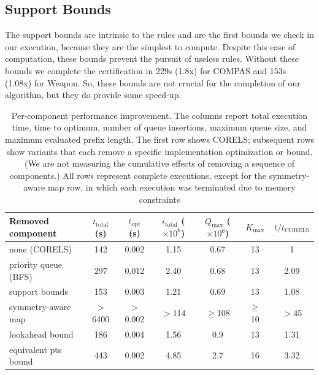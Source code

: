 \subsection{Support Bounds}

The support bounds are intrinsic to the rules and are the first bounds we check in our execution, because they are the simplest to compute.
Despite this ease of computation, these bounds prevent the pursuit of useless rules.
Without these bounds we complete the certification in 229s (1.8x) for COMPAS and 153s (1.08x) for Weapon.
So, these bounds are not crucial for the completion of our algorithm, but they do provide some speed-up.

\begin{table}[t!]
\begin{adjustwidth}{-.4in}{-.4in}
\begin{tabular}{l | c | c | c | c | c | c} 
  Removed component & $t_\text{total}$ (s) & $t_\text{opt}$ (s) & $i_\text{total}$ ($\times 10^6$) & $Q_\text{max}$ ($\times 10^6$) & $K_\text{max}$ & $t/t_\text{CORELS}$ \\
\hline
none (CORELS) & 142 & 0.002 & 1.15 & 0.67 & 13 & 1 \\
priority queue (BFS) & 297 & 0.012 & 2.40 & 0.68 & 13 & 2.09\\
support bounds & 153 & 0.003 & 1.21 & 0.69 & 13 & 1.08 \\
symmetry-aware map & $>$ 6400 & $>$0.002 & $>$114 & $\ge$108 & $\ge$ 10 & $>$45\\
lookahead bound & 186 & 0.004 & 1.56 & 0.9 & 13 & 1.31\\
equivalent pts bound & 443 & 0.002 & 4.85 & 2.7 & 16 & 3.32
\end{tabular}
\vspace{3mm}
\caption{Per-component performance improvement.
%
The columns report total execution time,
time to optimum, number of queue insertions,
maximum queue size, and maximum evaluated prefix length.
%
The first row shows CORELS; subsequent rows show variants
that each remove a specific implementation optimization or bound.
%
(We are not measuring the cumulative effects of removing a sequence of components.)
%
All rows represent complete executions, except for the symmetry-aware map row,
in which each execution was terminated due to memory constraints
}
\label{tab:weapon}
\end{adjustwidth}
\end{table}

